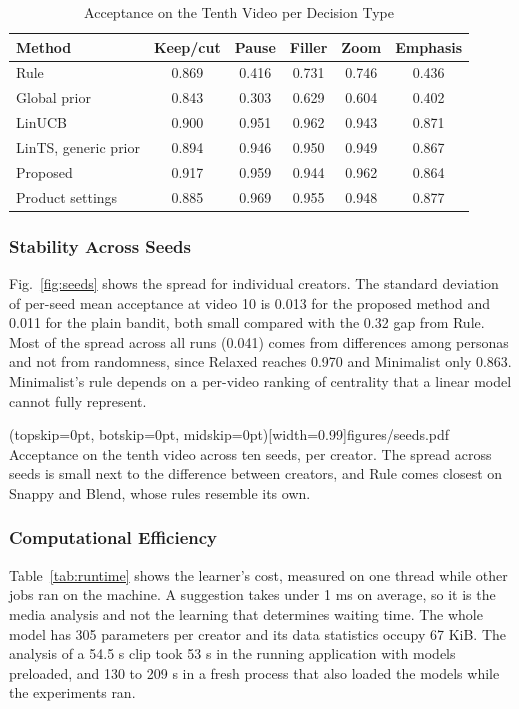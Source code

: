 \documentclass{ieeeaccess}
\begin{document}
\begin{table}[t]
\caption{Acceptance on the Tenth Video per Decision Type}
\label{tab:type}
\setlength{\tabcolsep}{3pt}
\centering
\begin{tabular}{|l|c|c|c|c|c|}
\hline
Method & Keep/cut & Pause & Filler & Zoom & Emphasis \\
\hline
Rule & 0.869 & 0.416 & 0.731 & 0.746 & 0.436 \\
Global prior & 0.843 & 0.303 & 0.629 & 0.604 & 0.402 \\
LinUCB & 0.900 & 0.951 & 0.962 & 0.943 & 0.871 \\
LinTS, generic prior & 0.894 & 0.946 & 0.950 & 0.949 & 0.867 \\
Proposed & 0.917 & 0.959 & 0.944 & 0.962 & 0.864 \\
Product settings & 0.885 & 0.969 & 0.955 & 0.948 & 0.877 \\
\hline
\end{tabular}
\end{table}

\subsubsection{Stability Across Seeds}
Fig.~\ref{fig:seeds} shows the spread for individual creators. The standard deviation of per-seed mean acceptance at video 10 is 0.013 for the proposed method and 0.011 for the plain bandit, both small compared with the 0.32 gap from Rule. Most of the spread across all runs (0.041) comes from differences among personas and not from randomness, since Relaxed reaches 0.970 and Minimalist only 0.863. Minimalist's rule depends on a per-video ranking of centrality that a linear model cannot fully represent.

\Figure[t!](topskip=0pt, botskip=0pt, midskip=0pt)[width=0.99\columnwidth]{figures/seeds.pdf}
{Acceptance on the tenth video across ten seeds, per creator. The spread across seeds is small next to the difference between creators, and Rule comes closest on Snappy and Blend, whose rules resemble its own.\label{fig:seeds}}

\subsubsection{Computational Efficiency}
Table~\ref{tab:runtime} shows the learner's cost, measured on one thread while other jobs ran on the machine. A suggestion takes under 1 ms on average, so it is the media analysis and not the learning that determines waiting time. The whole model has 305 parameters per creator and its data statistics occupy 67 KiB. The analysis of a 54.5 s clip took 53 s in the running application with models preloaded, and 130 to 209 s in a fresh process that also loaded the models while the experiments ran.
\end{document}
